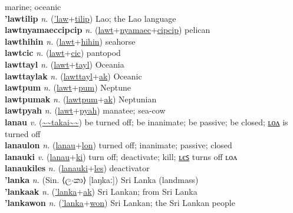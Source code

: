 marine; oceanic \label{lawtak} \\
\textbf{'lawtilip} \textit{n.} (\hyperref['law]{'law}+\hyperref[tilip]{tilip})
Lao; the Lao language \label{'lawtilip} \\
\textbf{lawtnyamaeccipcip} \textit{n.} (\hyperref[lawt]{lawt}+\hyperref[nyamaec]{nyamaec}+\hyperref[cipcip]{cipcip})
pelican \label{lawtnyamaeccipcip} \\
\textbf{lawthihin} \textit{n.} (\hyperref[lawt]{lawt}+\hyperref[hihin]{hihin})
seahorse \label{lawthihin} \\
\textbf{lawtcic} \textit{n.} (\hyperref[lawt]{lawt}+\hyperref[cic]{cic})
pantopod \label{lawtcic} \\
\textbf{lawttayl} \textit{n.} (\hyperref[lawt]{lawt}+\hyperref[tayl]{tayl})
Oceania \label{lawttayl} \\
\textbf{lawttaylak} \textit{n.} (\hyperref[lawttayl]{lawttayl}+\hyperref[ak]{ak})
Oceanic \label{lawttaylak} \\
\textbf{lawtpum} \textit{n.} (\hyperref[lawt]{lawt}+\hyperref[pum]{pum})
Neptune \label{lawtpum} \\
\textbf{lawtpumak} \textit{n.} (\hyperref[lawtpum]{lawtpum}+\hyperref[ak]{ak})
Neptunian \label{lawtpumak} \\
\textbf{lawtpyah} \textit{n.} (\hyperref[lawt]{lawt}+\hyperref[pyah]{pyah})
manatee; sea-cow \label{lawtpyah} \\
\textbf{lanau} \textit{v.} (\hyperref[takai]{\~{}\~{}takai\~{}\~{}})
be turned off; be inanimate; be passive; be closed; \hyperref[lanaulon]{ʟᴏᴧ} is turned off \label{lanau} \\
\textbf{lanaulon} \textit{n.} (\hyperref[lanau]{lanau}+\hyperref[lon]{lon})
turned off; inanimate; passive; closed \label{lanaulon} \\
\textbf{lanauki} \textit{v.} (\hyperref[lanau]{lanau}+\hyperref[ki]{ki})
turn off; deactivate; kill; \hyperref[lanaukiles]{ʟєꜱ} turns off ʟᴏᴧ \label{lanauki} \\
\textbf{lanaukiles} \textit{n.} (\hyperref[lanauki]{lanauki}+\hyperref[les]{les})
deactivator \label{lanaukiles} \\
\textbf{'lanka} \textit{n.} (Sin. ⟨ලංකා⟩ [laŋkaː])
Sri Lanka (landmass) \label{'lanka} \\
\textbf{'lankaak} \textit{n.} (\hyperref['lanka]{'lanka}+\hyperref[ak]{ak})
Sri Lankan; from Sri Lanka \label{'lankaak} \\
\textbf{'lankawon} \textit{n.} (\hyperref['lanka]{'lanka}+\hyperref[won]{won})
Sri Lankan; the Sri Lankan people \label{'lankawon} \\
